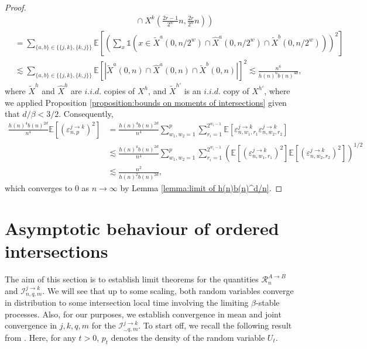 \documentclass[12pt]{article}
\newcommand{\R}{\mathcal R}
\newcommand{\I}{\mathcal I}
\newcommand{\EE}{\mathbb E}
\newcommand{\1}{\mathds{1}}
\numberwithin{equation}{section}
\begin{document}
\begin{proof}
\begin{align*}
        &\hspace{15em}\left.\cap\ X^{k}\left(\frac{2r-1}{2^w}n,\frac{2r}{2^w}n\right)\right)\\
        &=\sum_{\{a,b\}\in\{\{j,k\},\{k,j\}\}}
        \EE\left[\left(\sum_{x}\1\left(x\in\widetilde X^a(0,n/2^w)\cap \widehat X^a(0,n/2^w)\cap \widetilde X^{b}(0,n/2^w)\right)\right)^2\right]\\
        &\lesssim\sum_{\{a,b\}\in\{\{j,k\},\{k,j\}\}}\EE\left[\left|\widetilde X^a(0,n)\cap \widehat{X}^a(0,n)\cap \widetilde X^{b}(0,n)\right|\right]^2\lesssim\frac{n^6}{h(n)^6b(n)^{4d}},
    \end{align*}
    where $\widetilde X^h$ and $\widehat X^h$ are $i.i.d.$ copies of $X^h$, and $\widetilde X^{h'}$ is an $i.i.d.$ copy of $X^{h'}$, where we applied Proposition \ref{proposition:bounds on moments of intersections} given that $d/\beta<3/2$. Consequently,
    \begin{align*}
        \frac{h(n)^4b(n)^{2d}}{n^4}\EE\left[(\varepsilon_{n,p}^{j\rightarrow k})^2\right]&=\frac{h(n)^4b(n)^{2d}}{n^4}\sum_{w_1,w_2=1}^p\sum_{r_i=1}^{2^{w_i-1}}\EE\left[\varepsilon_{n,w_1,r_1}^{j\rightarrow k}\varepsilon_{n,w_2,r_2}^{j\rightarrow k}\right]\\
        &\lesssim\frac{h(n)^4b(n)^{2d}}{n^4}\sum_{w_1,w_2=1}^p\sum_{r_i=1}^{2^{w_i-1}}\left(\EE\left[\left(\varepsilon_{n,w_1,r_1}^{j\rightarrow k}\right)^2\right]\EE\left[\left(\varepsilon_{n,w_2,r_2}^{j\rightarrow k}\right)^2\right]\right)^{1/2}\\
        &\lesssim\frac{n^2}{h(n)^2b(n)^{2d}},
    \end{align*}
    which converges to $0$ as $n\rightarrow\infty$ by Lemma \ref{lemma:limit of h(n)b(n)^d/n}.

\end{proof}

\section{Asymptotic behaviour of ordered intersections}
\label{section:Limit Theorems for R^(A->B) and I^(A->B)}

The aim of this section is to establish limit theorems for the quantities $\R_n^{A\rightarrow B}$ and $\I_{n,q,m}^{j\rightarrow k}$. We will see that up to some scaling, both random variables converge in distribution to some intersection local time involving the limiting $\beta$-stable processes. Also, for our purposes, we establish convergence in mean and joint convergence in $j,k,q,m$ for the $\I_{.,q,m}^{j\rightarrow k}$. To start off, we recall the following result from \cite{LeGallRosenRangeOfStableRandomWalks1991}. Here, for any $t>0$, $p_t$ denotes the density of the random variable $U_t$. 
\end{document}
